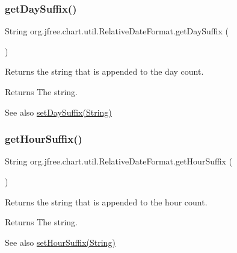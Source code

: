 \subsubsection{\texorpdfstring{get\+Day\+Suffix()}{getDaySuffix()}}
{\footnotesize\ttfamily String org.\+jfree.\+chart.\+util.\+Relative\+Date\+Format.\+get\+Day\+Suffix (\begin{DoxyParamCaption}{ }\end{DoxyParamCaption})}

Returns the string that is appended to the day count.

\begin{DoxyReturn}{Returns}
The string.
\end{DoxyReturn}
\begin{DoxySeeAlso}{See also}
\mbox{\hyperlink{classorg_1_1jfree_1_1chart_1_1util_1_1_relative_date_format_ad7cc844d314d44b4430cc8f14f8e1063}{set\+Day\+Suffix(\+String)}} 
\end{DoxySeeAlso}
\mbox{\label{classorg_1_1jfree_1_1chart_1_1util_1_1_relative_date_format_aa2ed5b91f1be19847c95c52d6a0d43a8}} 
\subsubsection{\texorpdfstring{get\+Hour\+Suffix()}{getHourSuffix()}}
{\footnotesize\ttfamily String org.\+jfree.\+chart.\+util.\+Relative\+Date\+Format.\+get\+Hour\+Suffix (\begin{DoxyParamCaption}{ }\end{DoxyParamCaption})}

Returns the string that is appended to the hour count.

\begin{DoxyReturn}{Returns}
The string.
\end{DoxyReturn}
\begin{DoxySeeAlso}{See also}
\mbox{\hyperlink{classorg_1_1jfree_1_1chart_1_1util_1_1_relative_date_format_a3da1b648d57154883d335a57e01b43bd}{set\+Hour\+Suffix(\+String)}} 
\end{DoxySeeAlso}
\mbox{\label{classorg_1_1jfree_1_1chart_1_1util_1_1_relative_date_format_a9ee421e346664b3818e87c62d637e1f5}} 
